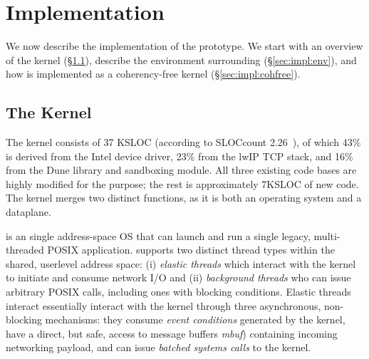 
\section{Implementation}
\label{sec:impl}






We now describe the implementation of the \ix prototype.  We start
with an overview of the \ix kernel (\S\ref{sec:impl:kernel}), describe
the environment surrounding \ix (\S\ref{sec:impl:env}), and how \ix is
implemented as a coherency-free kernel (\S\ref{sec:impl:cohfree}).




\subsection{The \ix Kernel}
\label{sec:impl:kernel}



The \ix kernel consists of 37 KSLOC (according to SLOCcount
2.26~\cite{url:sloccount}), of which 43\% is derived from the Intel
device driver, 23\% from the lwIP TCP stack, and 16\% from the Dune
library and sandboxing module.  All three existing code bases are
highly modified for the purpose; the rest is approximately 7KSLOC of
new code.  The \ix kernel merges two distinct functions, as it is both
an operating system and a dataplane.

 \ix is an single address-space OS that can launch and run a single
legacy, multi-threaded POSIX application. \ix supports two distinct
thread types within the shared, userlevel address space: (i)
\emph{elastic threads} which interact with the \ix kernel to initiate
and consume network I/O and (ii) \emph{background threads} who can
issue arbitrary POSIX calls, including ones with blocking conditions.
Elastic threads interact essentially interact with the kernel through
three asynchronous, non-blocking mechanisms: they consume \emph{event
  conditions} generated by the kernel, have a direct, but safe, access
to message buffers \emph{mbuf}) containing incoming networking
payload, and can issue \emph{batched systems calls} to the kernel.

